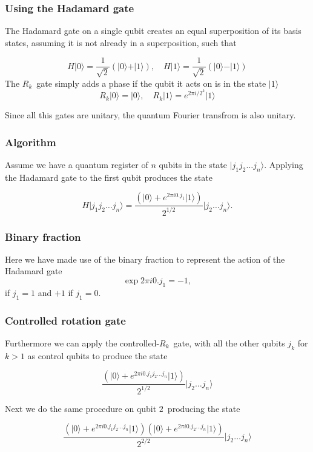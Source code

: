 \documentclass{beamer}
\begin{document}
\begin{frame}
\frametitle{Using the Hadamard gate}

The Hadamard
gate on a single qubit creates an equal superposition of its basis
states, assuming it is not already in a superposition, such that

\[
H\vert 0 \rangle = \frac{1}{\sqrt{2}} \left(\vert 0 \rangle + \vert 1\rangle\right), \quad H\vert 1\rangle = \frac{1}{\sqrt{2}} \left(\vert 0 \rangle - \vert 1\rangle\right)
\]
The $R_k$ gate simply adds a phase if the qubit it acts on is in the state $\vert 1\rangle$
\[
    R_k\vert 0 \rangle = \vert 0 \rangle, \quad R_k\vert 1\rangle = e^{2\pi i/2^{k}}\vert 1\rangle
\]

Since all this gates are unitary, the quantum Fourier transfrom is also unitary.
\end{frame}

\begin{frame}
\frametitle{Algorithm}

Assume we have a quantum register of $n$ qubits in the state $\vert j_1 j_2 \dots j_n\rangle$.
Applying the Hadamard gate to the first qubit
produces the state

\[
H\vert j_1 j_2 \dots j_n\rangle = \frac{\left(\vert 0 \rangle + e^{2\pi i 0.j_1}\vert 1\rangle\right)}{2^{1/2}} \vert j_2 \dots j_n\rangle.
\]
\end{frame}

\begin{frame}
\frametitle{Binary fraction}

Here we have made use of the binary fraction to represent the action of the Hadamard gate 
\[
\exp{2\pi i 0.j_1} = -1,
\]
if $j_1 = 1$ and $+1$ if $j_1 = 0$.
\end{frame}

\begin{frame}
\frametitle{Controlled rotation gate}

Furthermore we can apply the controlled-$R_k$ gate, with all the other qubits $j_k$ for $k>1$ as control qubits to produce the state

\[
\frac{\left(\vert 0 \rangle + e^{2\pi i 0.j_1j_2\dots j_n}\vert 1\rangle\right)}{2^{1/2}} \vert j_2 \dots j_n\rangle
\]

Next we do the same procedure on qubit $2$ producing the state

\[
\frac{\left(\vert 0 \rangle + e^{2\pi i 0.j_1j_2\dots j_n}\vert 1\rangle\right)\left(\vert 0 \rangle + e^{2\pi i 0.j_2\dots j_n}\vert 1\rangle\right)}{2^{2/2}} \vert j_2 \dots j_n\rangle
\]
\end{frame}
\end{document}
